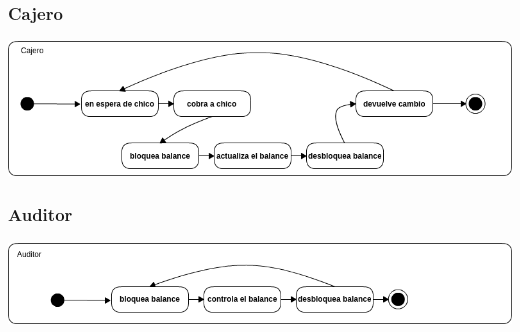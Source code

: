 \documentclass[a4paper,10pt]{article}
\begin{document}
	\subsubsection{Cajero}
	\begin{center}
        \includegraphics[scale=0.6]{cajero.png}
    \end{center}
    
	\subsubsection{Auditor}
    \begin{center}
        \includegraphics[scale=0.6]{auditor.png}
    \end{center}


\clearpage

\end{document}
